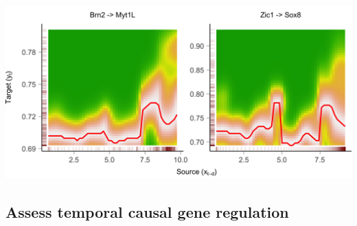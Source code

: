 \documentclass[10pt,oneside]{article}\usepackage[]{graphicx}\usepackage[]{color}
\makeatletter
\def\maxwidth{ %
  \ifdim\Gin@nat@width>\linewidth
    \linewidth
  \else
    \Gin@nat@width
  \fi
}
\newenvironment{knitrout}{}{} %
\makeatother
\begin{document}
\begin{knitrout}
{\centering \includegraphics[width=\maxwidth]{figure/plot_drevi-2} 

}



\end{knitrout}

\subsection{Assess temporal causal gene regulation}
\end{document}
